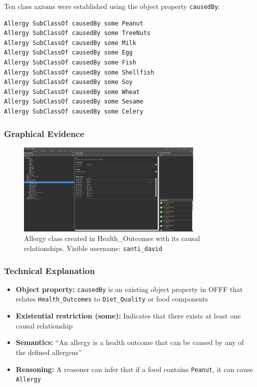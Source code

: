 \documentclass[12pt,a4paper]{article}
\begin{document}
Ten class axioms were established using the object property \texttt{causedBy}:

\begin{verbatim}
Allergy SubClassOf causedBy some Peanut
Allergy SubClassOf causedBy some TreeNuts
Allergy SubClassOf causedBy some Milk
Allergy SubClassOf causedBy some Egg
Allergy SubClassOf causedBy some Fish
Allergy SubClassOf causedBy some Shellfish
Allergy SubClassOf causedBy some Soy
Allergy SubClassOf causedBy some Wheat
Allergy SubClassOf causedBy some Sesame
Allergy SubClassOf causedBy some Celery
\end{verbatim}

\subsubsection{Graphical Evidence}

\begin{figure}[H]
    \centering
    \includegraphics[width=0.8\textwidth]{screenshots/allergy.png}
    \caption{Allergy class created in Health\_Outcomes with its causal relationships. Visible username: \texttt{santi\_david}}
    \label{fig:allergy_class}
\end{figure}

\subsubsection{Technical Explanation}

\begin{itemize}
    \item \textbf{Object property:} \texttt{causedBy} is an existing object property in OFFF that relates \texttt{Health\_Outcomes} to \texttt{Diet\_Quality} or food components
    \item \textbf{Existential restriction (some):} Indicates that there exists at least one causal relationship
    \item \textbf{Semantics:} ``An allergy is a health outcome that can be caused by any of the defined allergens''
    \item \textbf{Reasoning:} A reasoner can infer that if a food contains \texttt{Peanut}, it can cause \texttt{Allergy}
\end{itemize}
\end{document}
